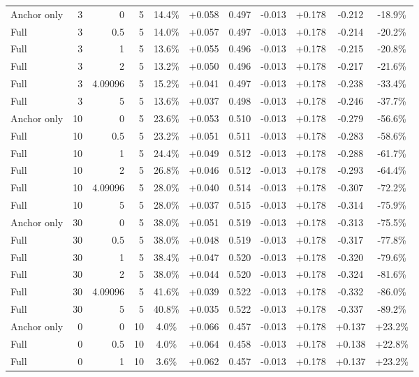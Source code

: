 \begin{table}[htbp]
\begin{tabular}{lrrrccccccc}
Anchor only & 3 & 0 & 5 & 14.4\% & +0.058 & 0.497 & -0.013 & +0.178 & -0.212 & -18.9\% \\
Full & 3 & 0.5 & 5 & 14.0\% & +0.057 & 0.497 & -0.013 & +0.178 & -0.214 & -20.2\% \\
Full & 3 & 1 & 5 & 13.6\% & +0.055 & 0.496 & -0.013 & +0.178 & -0.215 & -20.8\% \\
Full & 3 & 2 & 5 & 13.2\% & +0.050 & 0.496 & -0.013 & +0.178 & -0.217 & -21.6\% \\
Full & 3 & 4.09096 & 5 & 15.2\% & +0.041 & 0.497 & -0.013 & +0.178 & -0.238 & -33.4\% \\
Full & 3 & 5 & 5 & 13.6\% & +0.037 & 0.498 & -0.013 & +0.178 & -0.246 & -37.7\% \\
Anchor only & 10 & 0 & 5 & 23.6\% & +0.053 & 0.510 & -0.013 & +0.178 & -0.279 & -56.6\% \\
Full & 10 & 0.5 & 5 & 23.2\% & +0.051 & 0.511 & -0.013 & +0.178 & -0.283 & -58.6\% \\
Full & 10 & 1 & 5 & 24.4\% & +0.049 & 0.512 & -0.013 & +0.178 & -0.288 & -61.7\% \\
Full & 10 & 2 & 5 & 26.8\% & +0.046 & 0.512 & -0.013 & +0.178 & -0.293 & -64.4\% \\
Full & 10 & 4.09096 & 5 & 28.0\% & +0.040 & 0.514 & -0.013 & +0.178 & -0.307 & -72.2\% \\
Full & 10 & 5 & 5 & 28.0\% & +0.037 & 0.515 & -0.013 & +0.178 & -0.314 & -75.9\% \\
Anchor only & 30 & 0 & 5 & 38.0\% & +0.051 & 0.519 & -0.013 & +0.178 & -0.313 & -75.5\% \\
Full & 30 & 0.5 & 5 & 38.0\% & +0.048 & 0.519 & -0.013 & +0.178 & -0.317 & -77.8\% \\
Full & 30 & 1 & 5 & 38.4\% & +0.047 & 0.520 & -0.013 & +0.178 & -0.320 & -79.6\% \\
Full & 30 & 2 & 5 & 38.0\% & +0.044 & 0.520 & -0.013 & +0.178 & -0.324 & -81.6\% \\
Full & 30 & 4.09096 & 5 & 41.6\% & +0.039 & 0.522 & -0.013 & +0.178 & -0.332 & -86.0\% \\
Full & 30 & 5 & 5 & 40.8\% & +0.035 & 0.522 & -0.013 & +0.178 & -0.337 & -89.2\% \\
Anchor only & 0 & 0 & 10 & 4.0\% & +0.066 & 0.457 & -0.013 & +0.178 & +0.137 & +23.2\% \\
Full & 0 & 0.5 & 10 & 4.0\% & +0.064 & 0.458 & -0.013 & +0.178 & +0.138 & +22.8\% \\
Full & 0 & 1 & 10 & 3.6\% & +0.062 & 0.457 & -0.013 & +0.178 & +0.137 & +23.2\% \\

\end{tabular}
\end{table}
